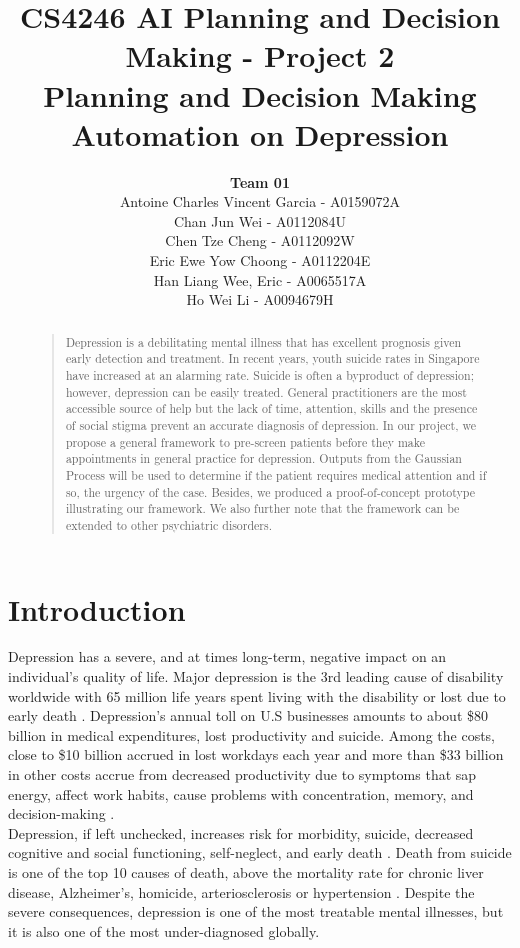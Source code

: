 \documentclass{article}
\title{
    CS4246 AI Planning and Decision Making - Project 2 \\
    Planning and Decision Making Automation on Depression
}
\author{
    {\bf Team 01} \\
    Antoine Charles Vincent Garcia - A0159072A\\
    Chan Jun Wei - A0112084U\\
    Chen Tze Cheng - A0112092W\\
    Eric Ewe Yow Choong - A0112204E\\
    Han Liang Wee, Eric - A0065517A\\
    Ho Wei Li - A0094679H\\
}
\begin{document}
     \maketitle

    \begin{abstract}
    \begin{quote}
    Depression is a debilitating mental illness that has excellent prognosis given early detection and treatment. In recent years, youth suicide rates in Singapore have increased at an alarming rate. Suicide is often a byproduct of depression; however, depression can be easily treated. General practitioners are the most accessible source of help but the lack of time, attention, skills and the presence of social stigma prevent an accurate diagnosis of depression. In our project, we propose a general framework to pre-screen patients before they make appointments in general practice for depression. Outputs from the Gaussian Process will be used to determine if the patient requires medical attention and if so, the urgency of the case. Besides, we produced a proof-of-concept prototype illustrating our framework. We also further note that the framework can be extended to other psychiatric disorders.\\
    \end{quote}
    \end{abstract}
    
    \section{Introduction}
    Depression has a severe, and at times long-term, negative impact on an individual's quality of life. 
    Major depression is the 3rd leading cause of disability worldwide with 65 million life years spent living with the disability or lost due to early death \cite{who2004}. Depression's annual toll on U.S businesses amounts to about \$80 billion in medical expenditures, lost productivity and suicide. Among the costs, close to \$10 billion accrued in lost workdays each year and more than \$33 billion in other costs accrue from decreased productivity due to symptoms that sap energy, affect work habits, cause problems with concentration, memory, and decision-making \cite{tjcp2015}. \\

    Depression, if left unchecked, increases risk for morbidity, suicide, decreased cognitive and social functioning, self-neglect, and early death \cite{arcp2009}. Death from suicide is one of the top 10 causes of death, above the mortality rate for chronic liver disease, Alzheimer's, homicide, arteriosclerosis or hypertension \cite{nvsr2016}. Despite the severe consequences, depression is one of the most treatable mental illnesses, but it is also one of the most under-diagnosed globally. \\
\end{document}
